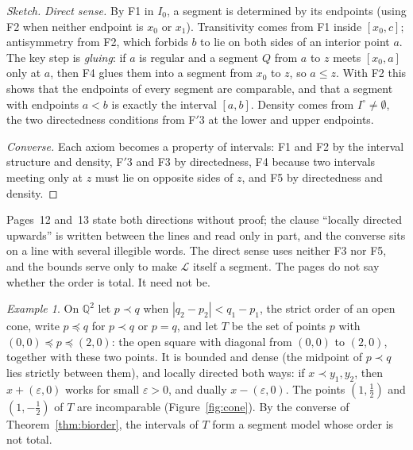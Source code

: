 \documentclass[11pt,a4paper]{amsart}
\theoremstyle{definition}
\theoremstyle{remark}
\newtheorem{example}[theorem]{Example}
\newcommand{\Q}{\mathbb Q}
\newcommand{\cL}{\mathcal L}
\begin{document}
\begin{proof}[Sketch]
\emph{Direct sense.} By F1 in $I_0$, a segment is determined by its endpoints (using F2 when neither endpoint is $x_0$ or $x_1$). Transitivity comes from F1 inside $[x_0, c]$; antisymmetry from F2, which forbids $b$ to lie on both sides of an interior point $a$. The key step is \emph{gluing}: if $a$ is regular and a segment $Q$ from $a$ to $z$ meets $[x_0, a]$ only at $a$, then F4 glues them into a segment from $x_0$ to $z$, so $a \le z$. With F2 this shows that the endpoints of every segment are comparable, and that a segment with endpoints $a < b$ is exactly the interval $[a, b]$. Density comes from $I^\circ \ne \emptyset$, the two directedness conditions from F$'$3 at the lower and upper endpoints.

\emph{Converse.} Each axiom becomes a property of intervals: F1 and F2 by the interval structure and density, F$'$3 and F3 by directedness, F4 because two intervals meeting only at $z$ must lie on opposite sides of $z$, and F5 by directedness and density.
\end{proof}

Pages~12 and~13 state both directions without proof; the clause ``locally directed upwards'' is written between the lines and read only in part, and the converse sits on a line with several illegible words. The direct sense uses neither F3 nor F5, and the bounds serve only to make $\cL$ itself a segment. The pages do not say whether the order is total. It need not be.

\begin{example}\label{ex:cone}
On $\Q^2$ let $p \prec q$ when $|q_2 - p_2| < q_1 - p_1$, the strict order of an open cone, write $p \preceq q$ for $p \prec q$ or $p = q$, and let $T$ be the set of points $p$ with $(0,0) \preceq p \preceq (2,0)$: the open square with diagonal from $(0,0)$ to $(2,0)$, together with these two points. It is bounded and dense (the midpoint of $p \prec q$ lies strictly between them), and locally directed both ways: if $x \prec y_1, y_2$, then $x + (\varepsilon, 0)$ works for small $\varepsilon > 0$, and dually $x - (\varepsilon, 0)$. The points $(1, \tfrac12)$ and $(1, -\tfrac12)$ of $T$ are incomparable (Figure~\ref{fig:cone}). By the converse of Theorem~\ref{thm:biorder}, the intervals of $T$ form a segment model whose order is not total.
\end{example}
\end{document}
